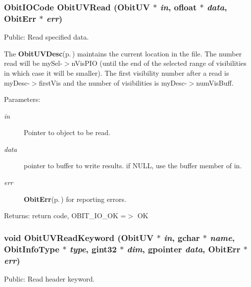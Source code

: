 \subsubsection{\setlength{\rightskip}{0pt plus 5cm}Obit\-IOCode Obit\-UVRead ({\bf Obit\-UV} $\ast$ {\em in}, {\bf ofloat} $\ast$ {\em data}, {\bf Obit\-Err} $\ast$ {\em err})}\label{ObitUV_8c_a22}


Public: Read specified data. 

The {\bf Obit\-UVDesc}{\rm (p.\,\pageref{structObitUVDesc})} maintains the current location in the file. The number read will be my\-Sel-$>$n\-Vis\-PIO (until the end of the selected range of visibilities in which case it will be smaller). The first visibility number after a read is my\-Desc-$>$first\-Vis and the number of visibilities is my\-Desc-$>$num\-Vis\-Buff. \begin{Desc}
\item[Parameters:]
\begin{description}
\item[{\em in}]Pointer to object to be read. \item[{\em data}]pointer to buffer to write results. if NULL, use the buffer member of in. \item[{\em err}]{\bf Obit\-Err}{\rm (p.\,\pageref{structObitErr})} for reporting errors. \end{description}
\end{Desc}
\begin{Desc}
\item[Returns:]return code, OBIT\_\-IO\_\-OK =$>$ OK \end{Desc}
\subsubsection{\setlength{\rightskip}{0pt plus 5cm}void Obit\-UVRead\-Keyword ({\bf Obit\-UV} $\ast$ {\em in}, gchar $\ast$ {\em name}, Obit\-Info\-Type $\ast$ {\em type}, gint32 $\ast$ {\em dim}, gpointer {\em data}, {\bf Obit\-Err} $\ast$ {\em err})}\label{ObitUV_8c_a40}


Public: Read header keyword. 

